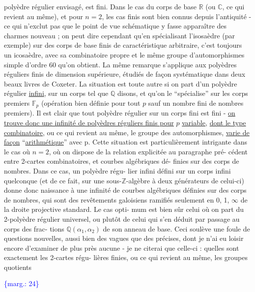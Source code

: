 \documentclass[11pt]{article}
\newcommand{\scanpage}[1]{\par\bigskip\noindent{\small\sffamily[scan #1]}\par}
\newcommand{\mspage}[1]{{\small\sffamily[p.\,#1]}}
\newcommand{\margin}[1]{\textcolor{blue}{\{\textsf{marg.:} #1\}}}
\newcommand{\uline}[1]{\underline{#1}}
\begin{document}
polyèdre régulier envisagé, est fini. Dans le cas du corps de
base $\mathbb{R}$ (ou $\mathbb{C}$, ce qui revient au même), et pour $n = 2$, les cas
finis sont bien connus depuis l'antiquité - ce qui n'exclut pas
que le point de vue schématique y fasse apparaître des charmes
nouveau ; on peut dire cependant qu'en spécialisant l'isosaèdre
(par exemple) sur des corps de base finis de caractéristique
arbitraire, c'est toujours un icosaèdre, avec sa combinatoire
propre et le même groupe d'automorphismes simple d'ordre 60 qu'on
obtient. La même remarque s'applique aux polyèdres réguliers finis
de dimension supérieure, étudiés de façon systématique dans deux
beaux livres de Coxeter. La situation est toute autre si on part
d'un polyèdre régulier \uline{infini}, sur un corps tel que $\mathbb{Q}$ disons,
et qu'on le ``spécialise'' sur les corps premiers $\mathbb{F}_p$ (opération
bien définie pour tout $p$ sauf un nombre fini de nombres premiers).
Il est clair que tout polyèdre régulier sur un corps fini est fini -
\uline{on trouve donc une infinité de polyèdres réguliers finis pour} $p$
\uline{variable}, \uline{dont le type combinatoire}, ou ce qui revient au même,
le groupe des automorphismes, \uline{varie de façon} ``\uline{arithmétique}'' avec p.
Cette situation est particulièrement intrigante  dans le cas où
$n = 2$, où on dispose de la relation explicitée au paragraphe pré-%
cédent entre 2-cartes combinatoires, et courbes algébriques dé-%
finies sur des corps de nombres. Dans ce cas, un polyèdre régu-%
lier infini défini sur un corps infini quelconque (et de ce fait,
sur une sous-$\mathbb{Z}$-algèbre à deux générateurs de celui-ci) donne donc
naissance à une infinité de courbes algébriques définies sur des
corps de nombres, qui sont des revêtements galoisiens ramifiés
seulement en 0, 1, $\infty$ de la droite projective standard. Le cas opti-%
mum est bien sûr celui où on part du 2-polyèdre régulier universel,
ou plutôt de celui qui s'en déduit par passage au corps des frac-%
tions $\mathbb{Q}(\alpha_1,\alpha_2)$ de son anneau de base. Ceci soulève une foule de
questions nouvelles, aussi bien des vagues que des précises, dont
je n'ai eu loisir encore d'examiner de plus près aucune - je ne
citerai que celle-ci : quelles sont exactement les 2-cartes régu-%
lières finies, ou ce qui revient au même, les groupes quotients

\margin{24}

\clearpage
\scanpage{119/25}
\mspage{23}
\end{document}
